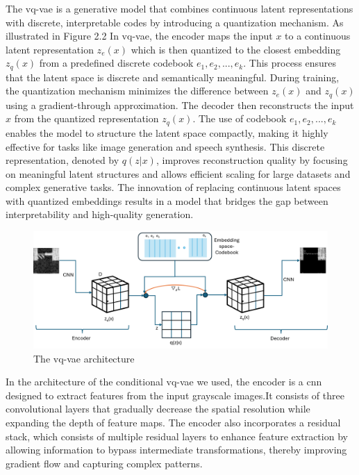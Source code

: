 The \gls{vq-vae} is a generative model that combines continuous latent representations with discrete, interpretable codes by introducing a quantization mechanism. As illustrated in Figure 2.2 In \gls{vq-vae}, the encoder maps the input $x$ to a continuous latent representation $z_e(x)$ which is then quantized to the closest embedding $z_q(x)$ from a predefined discrete codebook ${e_1,e_2,...,e_k}$. This process ensures that the latent space is discrete and semantically meaningful. During training, the quantization mechanism minimizes the difference between $z_e(x)$ and $z_q(x)$ using a gradient-through approximation. The decoder then reconstructs the input $x$ from the quantized representation $z_q(x)$. The use of codebook ${e_1,e_2,...,e_k}$ enables the model to structure the latent space compactly, making it highly effective for tasks like image generation and speech synthesis. This discrete representation, denoted by $q(z|x)$, improves reconstruction quality by focusing on meaningful latent structures and allows efficient scaling for large datasets and complex generative tasks. The innovation of replacing continuous latent spaces with quantized embeddings results in a model that bridges the gap between interpretability and high-quality generation.

\begin{figure}[h]
\includegraphics[width=\textwidth]{figures/vq-vae.png}
\centering
\caption{The \gls{vq-vae} architecture  }
\centering
\end{figure}


In the architecture of the conditional \gls{vq-vae} we used, the encoder is a \gls{cnn} designed to extract features from the input grayscale images.It consists of three convolutional layers that gradually decrease the spatial resolution while expanding the depth of feature maps. The encoder also incorporates a residual stack, which consists of multiple residual layers to enhance feature extraction by allowing information to bypass intermediate transformations, thereby improving gradient flow and capturing complex patterns.

